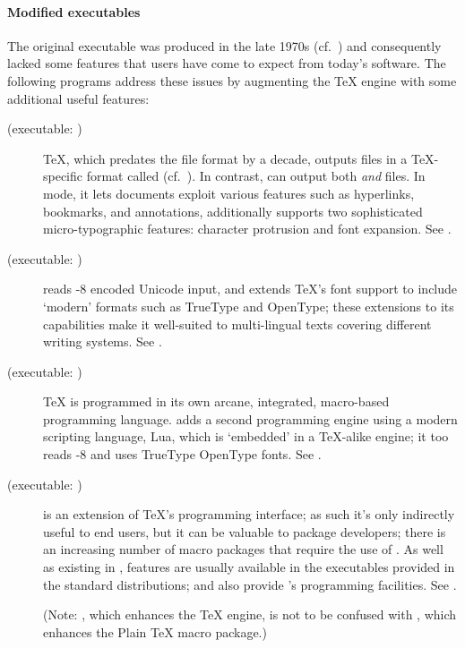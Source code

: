\paragraph{Modified  executables}
The original  executable was produced in the late 1970s
(cf.~) and consequently
lacked some features that users have come to expect from today's
software.  The following programs address these issues by augmenting
the \TeX{} engine with some additional useful features:

\begin{description}
  \item[\PDFTeX{} (executable: )]
  \TeX{}, which predates the  file format by a decade,
  outputs files in a \TeX{}-specific format called 
  (cf.~).  In
  contrast, \PDFTeX{} can output both  \emph{and} 
  files.  In  mode, it lets documents exploit various
   features such as hyperlinks, bookmarks, and annotations,
  \PDFTeX{} additionally supports two sophisticated micro-typographic
  features: character protrusion and font expansion.  See
  .

  \item[\xetex{} (executable: )]
  \xetex{} reads -8 encoded Unicode input, and extends
  \TeX{}'s font support to include `modern' formats such as TrueType
  and OpenType; these extensions to its capabilities make it
  well-suited to multi-lingual texts covering different writing
  systems.  See .

  \item[\LuaTeX{} (executable: )]
  \TeX{} is programmed in its own arcane, integrated, macro-based
  programming language.  \LuaTeX{} adds a second programming engine
  using a modern scripting language, Lua, which is `embedded' in a
  \TeX{}-alike engine; it too reads -8 and uses TrueType
  OpenType fonts.  See %
  .

  \item[\eTeX{} (executable: )]
  \eTeX{} is an extension of \TeX{}'s programming interface; as such
  it's only indirectly useful to end users, but it can be valuable to
  package developers; there is an increasing number of macro packages
  that require the use of \eTeX{}.  As well as existing in
  , \eTeX{} features are usually available in the
   executables provided in the standard
  distributions; \xetex{} and \LuaTeX{} also provide \eTeX{}'s
  programming facilities.    See %
  .

  (Note: \eTeX{}, which enhances the \TeX{} engine, is not to be
  confused with \Eplain{}, which enhances the Plain \TeX{} macro
  package.)
\end{description}


